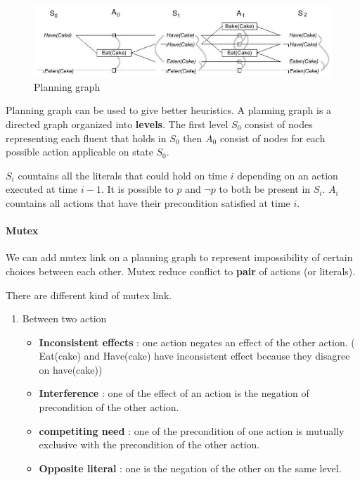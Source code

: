 \begin{figure}[h]
    \centering
    \includegraphics[width=16cm]{planning.png}
    \caption{Planning graph}
\end{figure}

Planning graph can be used to give better heuristics. A planning graph is a directed graph organized into \textbf{levels}. The first level $S_0$ consist of nodes representing each fluent that holds in $S_0$ then $A_0$ consist of nodes for each possible action applicable on state $S_0$.


$S_i$ countains all the literals that could hold on time $i$ depending on an action executed at time $i-1$. It is possible to $p$ and $\lnot p$ to both be present in $S_i$. $A_i$ countains all actions that have their precondition satisfied at time $i$.

\paragraph{Mutex}

We can  add mutex link  on a  planning graph to  represent impossibility
of  certain  choices  between  each  other.  Mutex  reduce  conflict  to
\textbf{pair} of actions (or literals).

There are different kind of mutex link.

\begin{enumerate}
    \item Between two action
        \begin{itemize}
            \item \textbf{Inconsistent effects} : one action negates an effect of the other action. ( Eat(cake) and Have(cake) have inconsistent effect because
            they disagree on have(cake))

        \item \textbf{Interference} : one of the effect of an action is the negation of precondition of the other action.

        \item \textbf{competiting need} : one of the precondition of one action is mutually exclusive with the precondition of the other action.

        \item \textbf{Opposite literal} : one is the negation of the other on the same level.
        \end{itemize}
\end{enumerate}

